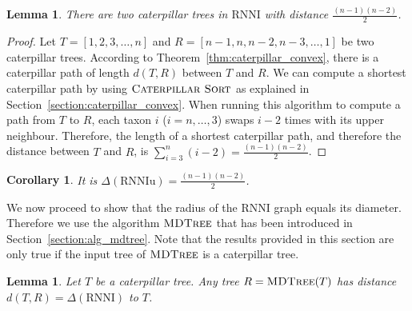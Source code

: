 \documentclass{amsart}
\newcommand{\rnni}{\mathrm{RNNI}}
\newcommand{\rnniu}{\mathrm{RNNIu}}
\newcommand{\csort}{\textsc{Caterpillar Sort}}
\newcommand{\mdtree}{\textsc{MDTree}}
\newtheorem{lemma}[definition]{Lemma}
\newtheorem{corollary}[definition]{Corollary}
\begin{document}
\begin{lemma}
There are two caterpillar trees in $\rnni$ with distance $\frac{(n-1)(n-2)}{2}$.
\label{lemma:caterpillar_diameter}
\end{lemma}

\begin{proof}
Let $T = [1,2,3,\ldots,n]$ and $R = [n-1,n,n-2,n-3, \ldots, 1]$ be two caterpillar trees.
According to Theorem~\ref{thm:caterpillar_convex}, there is a caterpillar path of length $d(T,R)$ between $T$ and $R$.
We can compute a shortest caterpillar path by using $\csort$ as explained in Section~\ref{section:caterpillar_convex}.
When running this algorithm to compute a path from $T$ to $R$, each taxon $i$ ($i = n, \ldots, 3$) swaps $i-2$ times with its upper neighbour.
Therefore, the length of a shortest caterpillar path, and therefore the distance between $T$ and $R$, is $\sum\limits_{i=3}^{n}(i-2)  = \frac{(n-1)(n-2)}{2}$.
\end{proof}

\begin{corollary}
It is $\Delta(\rnniu) = \frac{(n-1)(n-2)}{2}$.
\label{corollary:diameter}
\end{corollary}

We now proceed to show that the radius of the $\rnni$ graph equals its diameter.
Therefore we use the algorithm $\mdtree$ that has been introduced in Section~\ref{section:alg_mdtree}.
Note that the results provided in this section are only true if the input tree of $\mdtree$ is a caterpillar tree.

\begin{lemma}
Let $T$ be a caterpillar tree.
Any tree $R = \mdtree(T)$ has distance $d(T,R) = \Delta(\rnni)$ to $T$.
\label{lemma:max_dist_caterpillar}
\end{lemma}
\end{document}

